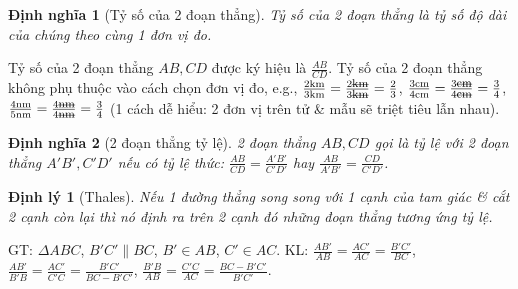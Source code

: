 \documentclass{article}
\newtheorem{dinhly}{Định lý}
\newtheorem{dinhnghia}{Định nghĩa}
\begin{document}
\begin{dinhnghia}[Tỷ số của 2 đoạn thẳng]
	\emph{Tỷ số của 2 đoạn thẳng} là tỷ số độ dài của chúng theo cùng 1 đơn vị đo.
\end{dinhnghia}
Tỷ số của 2 đoạn thẳng $AB,CD$ được ký hiệu là $\frac{AB}{CD}$. Tỷ số của 2 đoạn thẳng không phụ thuộc vào cách chọn đơn vị đo, e.g., $\frac{\rm2km}{\rm3km} = \frac{2\footnotesize\mbox{\st{km}}}{3\footnotesize\mbox{\st{km}}} = \frac{2}{3}$, $\frac{\rm3cm}{\rm4cm} = \frac{3\footnotesize\mbox{\st{cm}}}{4\footnotesize\mbox{\st{cm}}} = \frac{3}{4}$, $\frac{\rm4nm}{\rm5nm} = \frac{4\footnotesize\mbox{\st{nm}}}{4\footnotesize\mbox{\st{nm}}} = \frac{3}{4}$ (1 cách dễ hiểu: 2 đơn vị trên tử \& mẫu sẽ triệt tiêu lẫn nhau).

\begin{dinhnghia}[2 đoạn thẳng tỷ lệ]
	2 đoạn thẳng $AB,CD$ gọi là \emph{tỷ lệ} với 2 đoạn thẳng $A'B',C'D'$ nếu có tỷ lệ thức: $\frac{AB}{CD} = \frac{A'B'}{C'D'}$ hay $\frac{AB}{A'B'} = \frac{CD}{C'D'}$.
\end{dinhnghia}

\begin{dinhly}[Thales]
	\label{thm: Thales}
	Nếu 1 đường thẳng song song với 1 cạnh của  tam giác \& cắt 2 cạnh còn lại thì nó định ra trên 2 cạnh đó những đoạn thẳng tương ứng tỷ lệ.
\end{dinhly}
GT: $\Delta ABC$, $B'C'\parallel BC$, $B'\in AB$, $C'\in AC$. KL: $\frac{AB'}{AB} = \frac{AC'}{AC} = \frac{B'C'}{BC}$, $\frac{AB'}{B'B} = \frac{AC'}{C'C} = \frac{B'C'}{BC - B'C'}$, $\frac{B'B}{AB} = \frac{C'C}{AC} = \frac{BC - B'C'}{B'C'}$.
\end{document}
